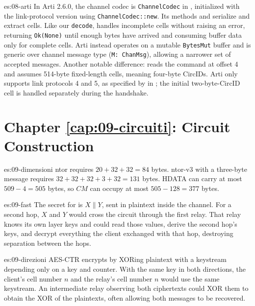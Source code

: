 \begin{soluzione}{es:08-arti}
In Arti 2.6.0, the channel codec is \texttt{ChannelCodec} in , initialized with the link-protocol version using \texttt{ChannelCodec::new}. Its methods  and  serialize and extract cells. Like our \texttt{decode},  handles incomplete cells without raising an error, returning \texttt{Ok(None)} until enough bytes have arrived and consuming buffer data only for complete cells. Arti instead operates on a mutable \texttt{BytesMut} buffer and is generic over channel message type (\texttt{M: ChanMsg}), allowing a narrower set of accepted messages. Another notable difference:  reads the command at offset 4 and assumes 514-byte fixed-length cells, meaning four-byte CircIDs. Arti only supports link protocols 4 and 5, as specified by  in ; the initial two-byte-CircID  cell is handled separately during the handshake.
\end{soluzione}

\section*{Chapter \ref{cap:09-circuiti}: Circuit Construction}

\begin{soluzione}{es:09-dimensioni}
ntor requires $20 + 32 + 32 = 84$ bytes. ntor-v3 with a three-byte message requires $32 + 32 + 32 + 3 + 32 = 131$ bytes. HDATA can carry at most $509 - 4 = 505$ bytes, so $CM$ can occupy at most $505 - 128 = 377$ bytes.
\end{soluzione}

\begin{soluzione}{es:09-fast}
The secret for  is $X \| Y$, sent in plaintext inside the channel. For a second hop, $X$ and $Y$ would cross the circuit through the first relay. That relay knows its own layer keys and could read those values, derive the second hop's keys, and decrypt everything the client exchanged with that hop, destroying separation between the hops.
\end{soluzione}

\begin{soluzione}{es:09-direzioni}
AES-CTR encrypts by XORing plaintext with a keystream depending only on a key and counter. With the same key in both directions, the client's cell number $n$ and the relay's cell number $n$ would use the same keystream. An intermediate relay observing both ciphertexts could XOR them to obtain the XOR of the plaintexts, often allowing both messages to be recovered.
\end{soluzione}

